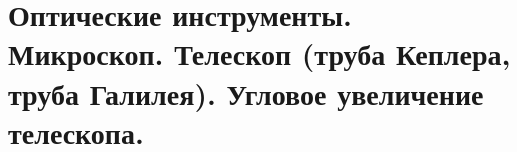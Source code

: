 \section{Оптические инструменты. Микроскоп. Телескоп (труба Кеплера, труба Галилея). Угловое увеличение телескопа.}

